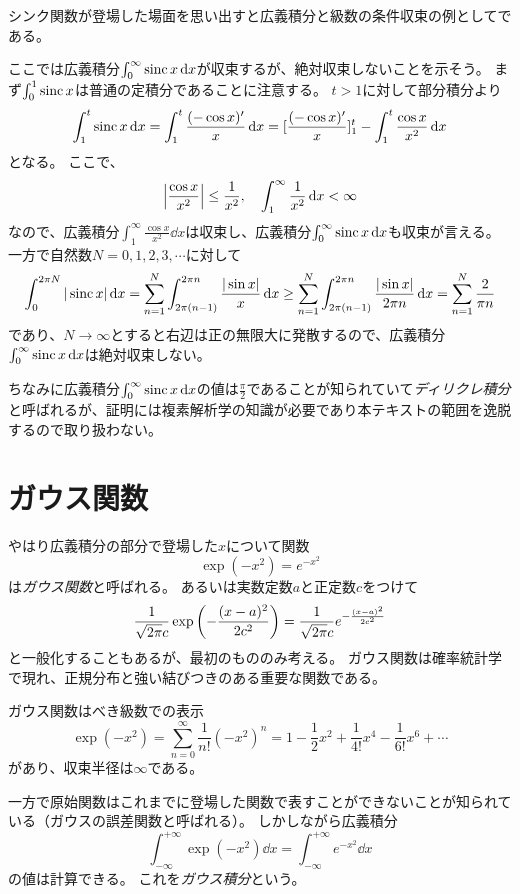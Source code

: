 シンク関数が登場した場面を思い出すと広義積分と級数の条件収束の例としてである。

ここでは広義積分$\int_0^\infty \operatorname{sinc} x\dd{x}$が収束するが、絶対収束しないことを示そう。
まず$\int_0^1 \operatorname{sinc} x$は普通の定積分であることに注意する。
$t > 1$に対して部分積分より
$$
\int_1^t \operatorname{sinc} x\dd{x} = \int_1^t \frac{(-\cos x)'}{x}\dd{x} = [\frac{(-\cos x)'}{x}]_1^t-\int_1^t \frac{\cos x}{x^2}\dd{x}
$$
となる。
ここで、
$$
\abs{\frac{\cos x}{x^2}} \le \frac{1}{x^2},
\quad \int_1^\infty \frac{1}{x^2}\dd{x} < \infty
$$
なので、広義積分$\int_1^\infty \frac{\cos x}{x^2}\dd{x}$は収束し、広義積分$\int_0^\infty \operatorname{sinc} x\dd{x}$も収束が言える。
一方で自然数$N = 0, 1, 2, 3, \cdots$に対して
$$
\int_0^{2\pi N} |\operatorname{sinc} x|\dd{x} = \sum_{n = 1}^N \int_{2\pi(n-1)}^{2\pi n} \frac{|\sin x|}{x}\dd{x} \ge \sum_{n = 1}^N \int_{2\pi(n-1)}^{2\pi n} \frac{|\sin x|}{2\pi n}\dd{x} = \sum_{n = 1}^N \frac{2}{\pi n}
$$
であり、$N \to \infty$とすると右辺は正の無限大に発散するので、広義積分$\int_0^\infty \operatorname{sinc} x\dd{x}$は絶対収束しない。

ちなみに広義積分$\int_0^\infty \operatorname{sinc} x\dd{x}$の値は$\frac{\pi}{2}$であることが知られていて\emph{ディリクレ積分}と呼ばれるが、証明には複素解析学の知識が必要であり本テキストの範囲を逸脱するので取り扱わない。

\section{ガウス関数}

やはり広義積分の部分で登場した$x$について関数
$$
\exp(-x^2) = e^{-x^2}
$$
は\emph{ガウス関数}と呼ばれる。
あるいは実数定数$a$と正定数$c$をつけて
$$
\frac{1}{\sqrt{2\pi}c}\exp\qty(-\frac{(x-a)^2}{2 c^2}) = \frac{1}{\sqrt{2\pi}c}e^{-\frac{(x-a)^2}{2 c^2}}
$$
と一般化することもあるが、最初のもののみ考える。
ガウス関数は確率統計学で現れ、正規分布と強い結びつきのある重要な関数である。

ガウス関数はべき級数での表示
$$
\exp(-x^2) = \sum_{n = 0}^\infty \frac{1}{n!}(-x^2)^n = 1-\frac{1}{2}x^2+\frac{1}{4!}x^4-\frac{1}{6!}x^6+\cdots
$$
があり、収束半径は$\infty$である。

一方で原始関数はこれまでに登場した関数で表すことができないことが知られている（ガウスの誤差関数と呼ばれる）。
しかしながら広義積分
$$
\int_{-\infty}^{+\infty}\exp(-x^2)\dd{x} = \int_{-\infty}^{+\infty} e^{-x^2}\dd{x}
$$
の値は計算できる。
これを\emph{ガウス積分}という。

